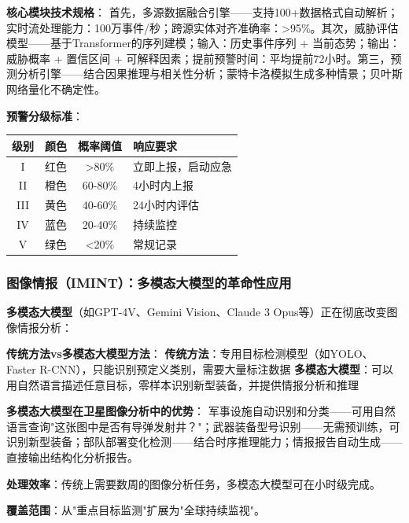 \textbf{核心模块技术规格}：
首先，多源数据融合引擎——支持100+数据格式自动解析；实时流处理能力：100万事件/秒；跨源实体对齐准确率：>95\%。其次，威胁评估模型——基于Transformer的序列建模；输入：历史事件序列 + 当前态势；输出：威胁概率 + 置信区间 + 可解释因素；提前预警时间：平均提前72小时。第三，预测分析引擎——结合因果推理与相关性分析；蒙特卡洛模拟生成多种情景；贝叶斯网络量化不确定性。

\textbf{预警分级标准}：
\begin{center}
\begin{tabular}{cccl}
\toprule
\textbf{级别} & \textbf{颜色} & \textbf{概率阈值} & \textbf{响应要求} \\
\midrule
I & 红色 & >80\% & 立即上报，启动应急 \\
II & 橙色 & 60-80\% & 4小时内上报 \\
III & 黄色 & 40-60\% & 24小时内评估 \\
IV & 蓝色 & 20-40\% & 持续监控 \\
V & 绿色 & <20\% & 常规记录 \\
\bottomrule
\end{tabular}
\end{center}


\subsubsection{图像情报（IMINT）：多模态大模型的革命性应用}

\textbf{多模态大模型}（如GPT-4V、Gemini Vision、Claude 3 Opus等）正在彻底改变图像情报分析：

\textbf{传统方法vs多模态大模型方法}：
\textbf{传统方法}：专用目标检测模型（如YOLO、Faster R-CNN），只能识别预定义类别，需要大量标注数据 \textbf{多模态大模型}：可以用自然语言描述任意目标，零样本识别新型装备，并提供情报分析和推理

\textbf{多模态大模型在卫星图像分析中的优势}：
军事设施自动识别和分类——可用自然语言查询"这张图中是否有导弹发射井？"；武器装备型号识别——无需预训练，可识别新型装备；部队部署变化检测——结合时序推理能力；情报报告自动生成——直接输出结构化分析报告。

\textbf{处理效率}：传统上需要数周的图像分析任务，多模态大模型可在小时级完成。

\textbf{覆盖范围}：从"重点目标监测"扩展为"全球持续监视"。


